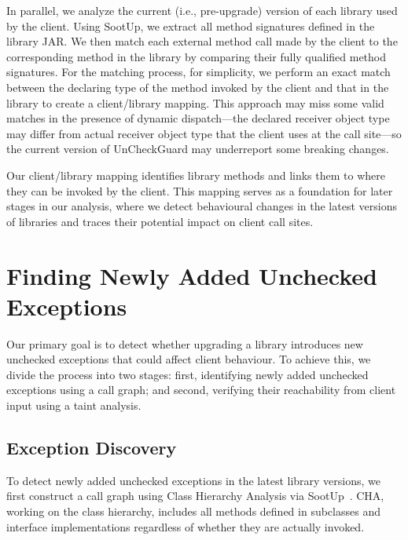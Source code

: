 In parallel, we analyze the current (i.e., pre-upgrade) version of each library used by the client. Using SootUp, we extract all method signatures defined in the library JAR. We then match each external method call made by the client to the corresponding method in the library by comparing their fully qualified method signatures. For the matching process, for simplicity, we perform an exact match between the declaring type of the method invoked by the client and that in the library to create a client/library mapping. This approach may miss some valid matches in the presence of dynamic dispatch---the declared receiver object type may differ from actual receiver object type that the client uses at the call site---so the current version of UnCheckGuard may underreport some breaking changes.

Our client/library mapping identifies library methods and links them to where they can be invoked by the client. This mapping serves as a foundation for later stages in our analysis, where we detect behavioural changes in the latest versions of libraries and traces their potential impact on client call sites.

\section{Finding Newly Added Unchecked Exceptions}

Our primary goal is to detect whether upgrading a library introduces new unchecked exceptions that could affect client behaviour. To achieve this, we divide the process into two stages: first, identifying newly added unchecked exceptions using a call graph; and second, verifying their reachability from client input using a taint analysis.

\subsection{Exception Discovery}

To detect newly added unchecked exceptions in the latest library versions, we first construct a call graph using Class Hierarchy Analysis via SootUp~\cite{Karakaya24:_sootup}. CHA, working on the class hierarchy, includes all methods defined in subclasses and interface implementations regardless of whether they are actually invoked.



